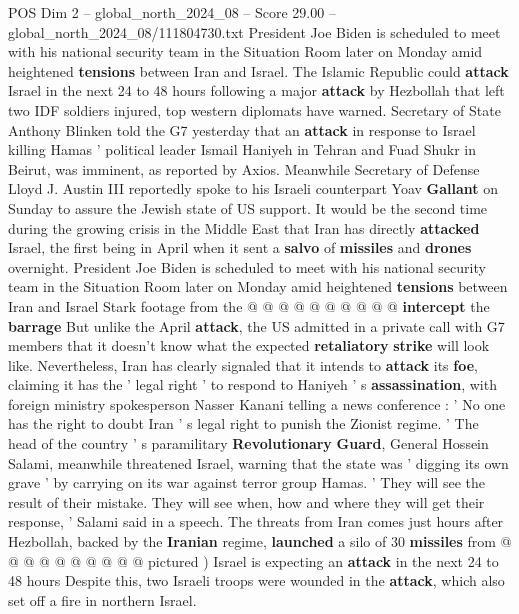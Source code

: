 \begin{textsample}{POS Dim 2 – global\_north\_2024\_08 – Score 29.00 – global\_north\_2024\_08/111804730.txt}  \label{ex:f2_pos_086}
President Joe Biden is scheduled to meet with his national security team in the Situation Room later on Monday amid heightened \textbf{tensions} between Iran and Israel.
The Islamic Republic could \textbf{attack} Israel in the next 24 to 48 hours following a major \textbf{attack} by Hezbollah that left two IDF soldiers injured, top western diplomats have warned.
Secretary of State Anthony Blinken told the G7 yesterday that an \textbf{attack} in response to Israel killing Hamas ' political leader Ismail Haniyeh in Tehran and Fuad Shukr in Beirut, was imminent, as reported by Axios.
Meanwhile Secretary of Defense Lloyd J.
Austin III reportedly spoke to his Israeli counterpart Yoav \textbf{Gallant} on Sunday to assure the Jewish state of US support.
It would be the second time during the growing crisis in the Middle East that Iran has directly \textbf{attacked} Israel, the first being in April when it sent a \textbf{salvo} of \textbf{missiles} and \textbf{drones} overnight.
President Joe Biden is scheduled to meet with his national security team in the Situation Room later on Monday amid heightened \textbf{tensions} between Iran and Israel Stark footage from the @ @ @ @ @ @ @ @ @ @ \textbf{intercept} the \textbf{barrage} But unlike the April \textbf{attack}, the US admitted in a private call with G7 members that it doesn't know what the expected \textbf{retaliatory} \textbf{strike} will look like.
Nevertheless, Iran has clearly signaled that it intends to \textbf{attack} its \textbf{foe}, claiming it has the ' legal right ' to respond to Haniyeh ' s \textbf{assassination}, with foreign ministry spokesperson Nasser Kanani telling a news conference : ' No one has the right to doubt Iran ' s legal right to punish the Zionist regime. ' The head of the country ' s paramilitary \textbf{Revolutionary} \textbf{Guard}, General Hossein Salami, meanwhile threatened Israel, warning that the state was ' digging its own grave ' by carrying on its war against terror group Hamas. ' They will see the result of their mistake.
They will see when, how and where they will get their response, ' Salami said in a speech.
The threats from Iran comes just hours after Hezbollah, backed by the \textbf{Iranian} regime, \textbf{launched} a silo of 30 \textbf{missiles} from @ @ @ @ @ @ @ @ @ @ pictured ) Israel is expecting an \textbf{attack} in the next 24 to 48 hours Despite this, two Israeli troops were wounded in the \textbf{attack}, which also set off a fire in northern Israel.

\end{textsample}
